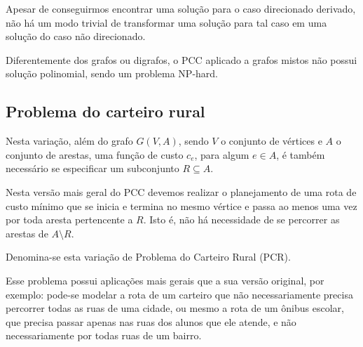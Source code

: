 \documentclass[12pt, a4paper]{article}
\begin{document}
    \begin{center}
        \hspace{3cm}%
    \end{center}

    Apesar de conseguirmos encontrar uma solução para o caso direcionado derivado, não há um modo trivial de transformar uma solução para tal caso em uma solução do caso não direcionado.

    Diferentemente dos grafos ou digrafos, o PCC aplicado a grafos mistos não possui solução polinomial, sendo um problema NP-hard. 

    \subsection{Problema do carteiro rural}
    
    Nesta variação, além do grafo $G(V, A)$, sendo $V$ o conjunto de vértices e $A$ o conjunto de arestas, uma função de custo $c_e$, para algum $e\in A$, é também necessário se especificar um subconjunto $R \subseteq A$. 

    Nesta versão mais geral do PCC devemos realizar o planejamento de uma rota de custo mínimo que se inicia e termina no mesmo vértice e passa ao menos uma vez por toda aresta pertencente a $R$. 
    Isto é, não há necessidade de se percorrer as arestas de $A \setminus R$.

    Denomina-se esta variação de Problema do Carteiro Rural (PCR).

    Esse problema possui aplicações mais gerais que a sua versão original, por exemplo: pode-se modelar a rota de um carteiro que não necessariamente precisa percorrer todas as ruas de uma cidade, ou mesmo a rota de um ônibus escolar, que precisa passar apenas nas ruas dos alunos que ele atende, e não necessariamente por todas ruas de um bairro.
\end{document}
